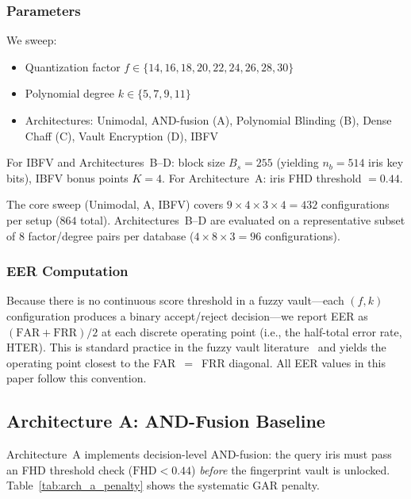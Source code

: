 \documentclass[conference]{IEEEtran}
\newcommand{\IBFV}{\textsf{IBFV}}
\newcommand{\FHD}{\mathrm{FHD}}
\begin{document}
\subsubsection{Parameters}
We sweep:
\begin{itemize}
    \item Quantization factor $f \in \{14, 16, 18, 20, 22, 24, 26, 28, 30\}$
    \item Polynomial degree $k \in \{5, 7, 9, 11\}$
    \item Architectures: Unimodal, AND-fusion (A), Polynomial Blinding (B), Dense Chaff (C), Vault Encryption (D), \IBFV{}
\end{itemize}
For \IBFV{} and Architectures~B--D: block size $B_s = 255$ (yielding $n_b = 514$ iris key bits), \IBFV{} bonus points $K = 4$. For Architecture~A: iris FHD threshold $= 0.44$.

The core sweep (Unimodal, A, \IBFV{}) covers $9 \times 4 \times 3 \times 4 = 432$ configurations per setup ($864$ total). Architectures~B--D are evaluated on a representative subset of $8$ factor/degree pairs per database ($4 \times 8 \times 3 = 96$ configurations).

\subsubsection{EER Computation}
\label{sec:eer_computation}
Because there is no continuous score threshold in a fuzzy vault---each $(f, k)$ configuration produces a binary accept/reject decision---we report EER as $(\text{FAR} + \text{FRR})/2$ at each discrete operating point (i.e., the half-total error rate, HTER). This is standard practice in the fuzzy vault literature~\cite{nandakumar2007fuzzy,maurya2025enhancing} and yields the operating point closest to the FAR~$=$~FRR diagonal. All EER values in this paper follow this convention.

\subsection{Architecture A: AND-Fusion Baseline}
\label{sec:arch_a_results}

Architecture~A implements decision-level AND-fusion: the query iris must pass an FHD threshold check ($\FHD < 0.44$) \emph{before} the fingerprint vault is unlocked. Table~\ref{tab:arch_a_penalty} shows the systematic GAR penalty.
\end{document}
